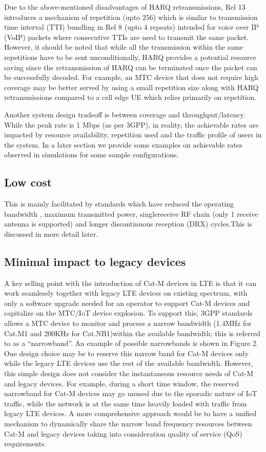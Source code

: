 \documentclass[conference,compsoc]{IEEEtran}
\begin{document}
Due to the above-mentioned disadvantages of HARQ retransmissions, Rel 13 introduces a mechanism of repetition (upto $256$) which is similar to transmission time interval (TTI) bundling in Rel 8 (upto $4$ repeats) intended for voice over IP (VoIP) packets where consecutive TTIs are used to transmit the same packet. However, it should be noted that while all the transmission within the same repetitions have to be sent unconditionally, HARQ provides a potential resource saving since the retransmission of HARQ can be terminated once the packet can be successfully decoded. For example, an MTC device that does not require high coverage may be better served by using a small repetition size along with HARQ retransmissions compared to a cell edge UE which relies primarily on repetition. 

Another system design tradeoff is between coverage and throughput/latency. While the peak rate is 1 Mbps (as per 3GPP), in reality, the achievable rates are impacted by resource availability, repetition used and the traffic profile of users in the system. In a later section we provide some examples on achievable rates observed in simulations for some sample configurations.

\subsection{Low cost}
This is mainly facilitated by standards which have reduced the operating bandwidth , maximum transmitted power, singlereceive RF chain (only 1 receive antenna is supported) and longer discontinuous reception (DRX) cycles.This is discussed in more detail later.

\subsection{Minimal impact to legacy devices}
A key selling point with the introduction of Cat-M devices in LTE is that it can work seamlessly together with legacy LTE devices on existing spectrum, with only a software upgrade needed for an operator to support Cat-M devices and capitalize on the MTC/IoT device explosion. To support this, 3GPP standards allows a MTC device to monitor and process a narrow bandwidth (1.4MHz for Cat.M1 and 200KHz for Cat.NB1)within the available bandwidth; this is referred to as a “narrowband”. An example of possible narrowbands is shown in Figure 2. One design choice may be to reserve this narrow band for Cat-M devices only while the legacy LTE devices use the rest of the available bandwidth. However, this simple design does not consider the instantaneous resource needs of Cat-M and legacy devices. For example, during a short time window, the reserved narrowband for Cat-M devices may go unused due to the sporadic nature of IoT traffic, while the network is at the same time heavily loaded with traffic from legacy LTE devices. A more comprehensive approach would be to have a unified mechanism to dynamically share the narrow band frequency resources between Cat-M and legacy devices taking into consideration quality of service (QoS) requirements. 
\end{document}
